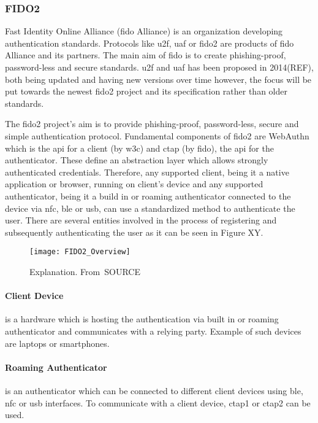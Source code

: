 \subsubsection{FIDO2}

Fast Identity Online Alliance (\acrshort{fido} Alliance) is an organization developing authentication standards. Protocols like \acrfull{u2f}, \acrfull{uaf} or \acrshort{fido}2 are products of \acrshort{fido} Alliance and its partners. The main aim of \acrshort{fido} is to create phishing-proof, password-less and secure standards. \acrshort{u2f} and \acrshort{uaf} has been proposed in 2014(REF), both being updated and having new versions over time however, the focus will be put towards the newest \acrshort{fido}2 project and its specification rather than older standards.

The \acrshort{fido}2 project’s aim is to provide phishing-proof, password-less, secure and simple authentication protocol. Fundamental components of \acrshort{fido}2 are WebAuthn which is the \acrshort{api} for a client (by \acrshort{w3c}) and \acrshort{ctap} (by \acrshort{fido}), the \acrshort{api} for the authenticator. These define an abstraction layer which allows strongly authenticated credentials. Therefore, any supported client, being it a native application or browser, running on client’s device and any supported authenticator, being it a build in or roaming authenticator connected to the device via \acrshort{nfc}, \acrshort{ble} or \acrshort{usb}, can use a standardized method to authenticate the user. There are several entities involved in the process of registering and subsequently authenticating the user as it can be seen in Figure XY.

\begin{figure}[ht]
    \centering
    \texttt{[image: FIDO2\_Overview]}
    \caption{Explanation. From~\cite{}SOURCE}
    \label{fig:fido2_overview}
\end{figure}

\paragraph{Client Device} 
is a hardware which is hosting the authentication via built in or roaming authenticator and communicates with a relying party. Example of such devices are laptops or smartphones. 

\paragraph{Roaming Authenticator} 
is an authenticator which can be connected to different client devices using \acrshort{ble}, \acrshort{nfc} or \acrshort{usb} interfaces. To communicate with a client device, \acrshort{ctap}1 or \acrshort{ctap}2 can be used.

